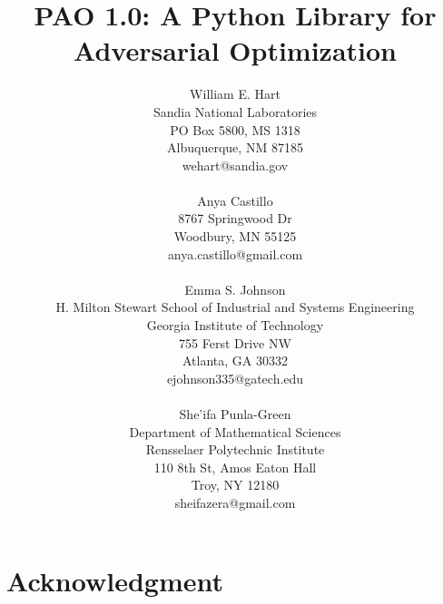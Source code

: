 \documentclass[pdf,12pt,article,relax,innertitle]{SANDreport}
\title{PAO 1.0: A Python Library for Adversarial Optimization}
\author{William E. Hart\\
            Sandia National Laboratories\\
           PO Box 5800, MS 1318 \\
           Albuquerque, NM 87185 \\
           wehart@sandia.gov\\
\\
        Anya Castillo\\
            8767 Springwood Dr\\
            Woodbury, MN 55125\\
            anya.castillo@gmail.com\\
\\
        Emma S. Johnson\\
        H. Milton Stewart School of Industrial and Systems Engineering\\
        Georgia Institute of Technology\\
        755 Ferst Drive NW\\
        Atlanta, GA 30332\\
        ejohnson335@gatech.edu\\
\\
        She'ifa Punla-Green\\
        Department of Mathematical Sciences\\
        Rensselaer Polytechnic Institute\\
        110 8th St, Amos Eaton Hall\\
        Troy, NY 12180\\
        sheifazera@gmail.com
        }
\date{}
\begin{document}

    \maketitle

    \begin{abstract}
	
    \end{abstract}


    \clearpage
    \section*{Acknowledgment}
	






\end{document}
